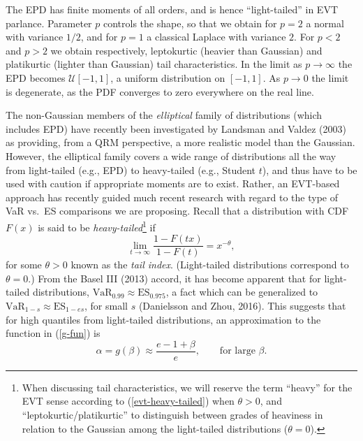 \documentclass[11pt]{article}
\newcommand{\be}{\begin{equation}}
\newcommand{\ee}{\end{equation}}
\begin{document}
The EPD has finite moments of all orders, and is hence
``light-tailed'' in EVT parlance. Parameter $p$ controls the shape, so that we obtain for $p=2$ a
normal with variance $1/2$, and for  $p=1$ a
classical Laplace with variance $2$. For $p<2$ and $p>2$ we obtain
respectively, leptokurtic (heavier than Gaussian) and platikurtic (lighter than Gaussian) tail characteristics. In the limit 
as $p\rightarrow\infty$ the EPD becomes $\mathcal{U}[-1,1]$, a uniform distribution on
$[-1,1]$. As $p\rightarrow 0$ the limit is degenerate, as the PDF converges to zero
everywhere on the real line. 


The non-Gaussian members of the \emph{elliptical} family of
distributions (which includes EPD) have recently been
investigated by Landsman and Valdez  (2003) as providing, from a QRM perspective, a more
realistic model than the Gaussian. However, the elliptical family
covers a wide range of distributions all the way from light-tailed
(e.g., EPD) to heavy-tailed (e.g., Student $t$), and thus have to
be used with caution if appropriate moments are to exist. Rather, an
EVT-based approach has recently guided much recent research with
regard to the type of VaR
vs.~ES comparisons we are proposing. Recall that a distribution with
CDF $F(x)$ is said to be \emph{heavy-tailed}\footnote{When discussing tail characteristics, we will reserve
  the term ``heavy'' for the
  EVT sense  according to (\ref{evt-heavy-tailed}) when $\theta>0$,
  and ``leptokurtic/platikurtic'' to distinguish between grades of
  heaviness in relation to the Gaussian among the light-tailed
  distributions ($\theta=0$).} if 
\be \label{evt-heavy-tailed}
\lim_{t\rightarrow\infty}\frac{1-F(tx)}{1-F(t)}=x^{-\theta}, 
\ee
for some $\theta>0$ known as the \emph{tail index}. (Light-tailed
distributions correspond to $\theta=0$.)
From the Basel III (2013) accord,
it has become apparent that for light-tailed distributions,
$\text{VaR}_{0.99}\approx\text{ES}_{0.975}$, a fact which can be
generalized to $\text{VaR}_{1-s}\approx\text{ES}_{1-es}$, for small
$s$ (Danielsson and Zhou, 2016). This suggests that for high
quantiles from light-tailed distributions, an
approximation to the function in (\ref{g-fun}) is 
\begin{equation}\label{general-basel-3}
\alpha=g(\beta)\approx\frac{e-1+\beta}{e}, \qquad\text{for large }\beta.
\end{equation}
\end{document}
